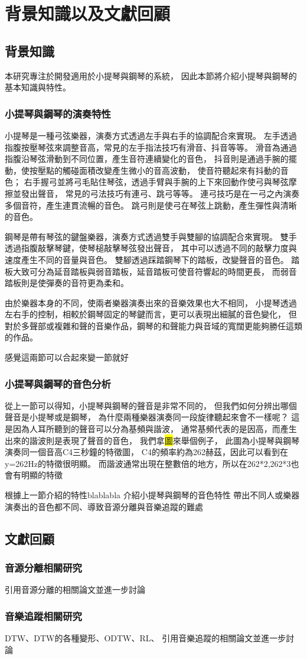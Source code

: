\documentclass[class=NCU_thesis, crop=false]{standalone}
\begin{document}
\chapter{背景知識以及文獻回顧}

\section{背景知識}
本研究專注於開發適用於小提琴與鋼琴的系統，
因此本節將介紹小提琴與鋼琴的基本知識與特性。

\subsection{小提琴與鋼琴的演奏特性}
小提琴是一種弓弦樂器，演奏方式透過左手與右手的協調配合來實現。
左手透過指腹按壓琴弦來調整音高，常見的左手指法技巧有滑音、抖音等等。
滑音為通過指腹沿琴弦滑動到不同位置，產生音符連續變化的音色，
抖音則是通過手腕的擺動，使按壓點的觸碰面積改變產生微小的音高波動，
使音符聽起來有抖動的音色；
右手握弓並將弓毛貼住琴弦，透過手臂與手腕的上下來回動作使弓與琴弦摩擦並發出聲音，
常見的弓法技巧有連弓、跳弓等等。
連弓技巧是在一弓之內演奏多個音符，產生連貫流暢的音色。
跳弓則是使弓在琴弦上跳動，產生彈性與清晰的音色。

鋼琴是帶有琴弦的鍵盤樂器，演奏方式透過雙手與雙腳的協調配合來實現。
雙手透過指腹敲擊琴鍵，使琴槌敲擊琴弦發出聲音，
其中可以透過不同的敲擊力度與速度產生不同的音量與音色。
雙腳透過踩踏鋼琴下的踏板，改變聲音的音色。
踏板大致可分為延音踏板與弱音踏板，延音踏板可使音符響起的時間更長，
而弱音踏板則是使彈奏的音符更為柔和。

由於樂器本身的不同，使兩者樂器演奏出來的音樂效果也大不相同，
小提琴透過左右手的控制，相較於鋼琴固定的琴鍵而言，更可以表現出細膩的音色變化，
但對於多聲部或複雜和聲的音樂作品，鋼琴的和聲能力與音域的寬闊更能夠勝任這類的作品。

感覺這兩節可以合起來變一節就好

\subsection{小提琴與鋼琴的音色分析} 
從上一節可以得知，小提琴與鋼琴的聲音是非常不同的，
但我們如何分辨出哪個聲音是小提琴或是鋼琴，
為什麼兩種樂器演奏同一段旋律聽起來會不一樣呢？
這是因為人耳所聽到的聲音可以分為基頻與諧波，
通常基頻代表的是因高，而產生出來的諧波則是表現了聲音的音色，
我們拿{\colorbox{yellow}{圖}}來舉個例子，
此圖為小提琴與鋼琴演奏同一個音高C4三秒鐘的特徵圖，
C4的頻率約為262赫茲，因此可以看到在y=262Hz的特徵很明顯。
而諧波通常出現在整數倍的地方，所以在262*2,262*3也會有明顯的特徵



根據上一節介紹的特性blablabla
介紹小提琴與鋼琴的音色特性
帶出不同人或樂器演奏出的音色都不同、導致音源分離與音樂追蹤的難處

\section{文獻回顧}
\subsection{音源分離相關研究}
引用音源分離的相關論文並進一步討論

\subsection{音樂追蹤相關研究}
DTW、DTW的各種變形、ODTW、RL、
引用音樂追蹤的相關論文並進一步討論
\end{document}
